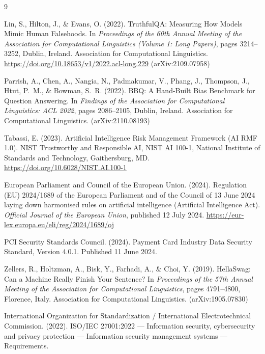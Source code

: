 \documentclass[11pt]{article}
\begin{document}
\begin{thebibliography}{9}

Lin, S., Hilton, J., \& Evans, O. (2022).
TruthfulQA: Measuring How Models Mimic Human Falsehoods.
In \emph{Proceedings of the 60th Annual Meeting of the Association for
Computational Linguistics (Volume 1: Long Papers)}, pages 3214--3252,
Dublin, Ireland. Association for Computational Linguistics.
\url{https://doi.org/10.18653/v1/2022.acl-long.229}
(arXiv:2109.07958)

Parrish, A., Chen, A., Nangia, N., Padmakumar, V., Phang, J.,
Thompson, J., Htut, P.~M., \& Bowman, S.~R. (2022).
BBQ: A Hand-Built Bias Benchmark for Question Answering.
In \emph{Findings of the Association for Computational Linguistics:
ACL 2022}, pages 2086--2105, Dublin, Ireland. Association for
Computational Linguistics. (arXiv:2110.08193)

Tabassi, E. (2023).
Artificial Intelligence Risk Management Framework (AI RMF 1.0).
NIST Trustworthy and Responsible AI, NIST AI 100-1, National Institute
of Standards and Technology, Gaithersburg, MD.
\url{https://doi.org/10.6028/NIST.AI.100-1}

European Parliament and Council of the European Union. (2024).
Regulation (EU) 2024/1689 of the European Parliament and of the
Council of 13 June 2024 laying down harmonised rules on artificial
intelligence (Artificial Intelligence Act).
\emph{Official Journal of the European Union}, published 12 July 2024.
\url{https://eur-lex.europa.eu/eli/reg/2024/1689/oj}

PCI Security Standards Council. (2024).
Payment Card Industry Data Security Standard, Version 4.0.1.
Published 11 June 2024.

Zellers, R., Holtzman, A., Bisk, Y., Farhadi, A., \& Choi, Y. (2019).
HellaSwag: Can a Machine Really Finish Your Sentence?
In \emph{Proceedings of the 57th Annual Meeting of the Association for
Computational Linguistics}, pages 4791--4800, Florence, Italy.
Association for Computational Linguistics. (arXiv:1905.07830)

International Organization for Standardization / International
Electrotechnical Commission. (2022).
ISO/IEC 27001:2022 --- Information security, cybersecurity and privacy
protection --- Information security management systems ---
Requirements.

\end{thebibliography}
\end{document}
